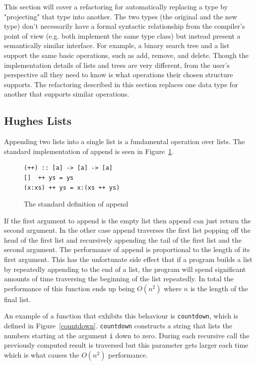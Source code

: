 This section will cover a refactoring for automatically replacing a type by "projecting" that type into another. The two types (the original and the new type) don't necessarily have a formal syntactic relationship from the compiler's point of view (e.g. both implement the same type class) but instead present a semantically similar interface. For example, a binary search tree and a list support the same basic operations, such as add, remove, and delete. Though the implementation details of lists and trees are very different, from the user's perspective all they need to know is what operations their chosen structure supports. The refactoring described in this section replaces one data type for another that supports similar operations.

\subsection{Hughes Lists}

Appending two lists into a single list is a fundamental operation over lists. The standard implementation of append is seen in Figure~\ref{append}.

\begin{figure}[t]
\begin{lstlisting}
(++) :: [a] -> [a] -> [a]
[]  ++ ys = ys
(x:xs) ++ ys = x:(xs ++ ys)
\end{lstlisting}
\caption{The standard definition of append}
\label{append}
\end{figure}

If the first argument to append is the empty list then append can just return the second argument. In the other case append traverses the first list popping off the head of the first list and recursively appending the tail of the first list and the second argument. The performance of append is proportional to the length of its first argument. This has the unfortunate side effect that if a program builds a list by repeatedly appending  to the end of a list, the program will spend significant amounts of time traversing the beginning of the list repeatedly. In total the performance of this function ends up being $O(n^2)$ where $n$ is the length of the final list.

An example of a function that exhibits this behaviour is \texttt{countdown}, which is defined in Figure~\ref{countdown}. \texttt{countdown} constructs a string that lists the numbers starting at the argument \texttt{i} down to zero. During each recursive call the previously computed result is traversed but this parameter gets larger each time which is what causes the $O(n^2)$ performance.


